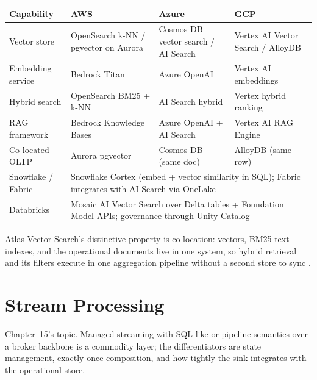 \begin{center}
\footnotesize
\begin{tabular}{@{}p{2.9cm}p{3.0cm}p{3.0cm}p{3.0cm}@{}}
\toprule
\textbf{Capability} & \textbf{AWS} & \textbf{Azure} & \textbf{GCP} \\
\midrule
Vector store & OpenSearch k-NN / pgvector on Aurora & Cosmos DB vector search / AI Search & Vertex AI Vector Search / AlloyDB \\
Embedding service & Bedrock Titan & Azure OpenAI & Vertex AI embeddings \\
Hybrid search & OpenSearch BM25 + k-NN & AI Search hybrid & Vertex hybrid ranking \\
RAG framework & Bedrock Knowledge Bases & Azure OpenAI + AI Search & Vertex AI RAG Engine \\
Co-located OLTP & Aurora pgvector & Cosmos DB (same doc) & AlloyDB (same row) \\
\addlinespace
Snowflake / Fabric & \multicolumn{3}{l}{Snowflake Cortex (embed + vector similarity in SQL); Fabric integrates with AI Search via OneLake} \\
Databricks & \multicolumn{3}{l}{Mosaic AI Vector Search over Delta tables + Foundation Model APIs; governance through Unity Catalog} \\
\bottomrule
\end{tabular}
\end{center}

\noindent Atlas Vector Search's distinctive property is co-location: vectors, BM25 text indexes,
and the operational documents live in one system, so hybrid retrieval and its filters execute in
one aggregation pipeline without a second store to sync
\cite{mongodbAtlasVectorSearch,mongodbAtlasSearchDocs,malkov2020hnsw}.

\section{Stream Processing}
%
Chapter~15's topic. Managed streaming with SQL-like or pipeline semantics over a broker backbone
is a commodity layer; the differentiators are state management, exactly-once composition, and how
tightly the sink integrates with the operational store.

